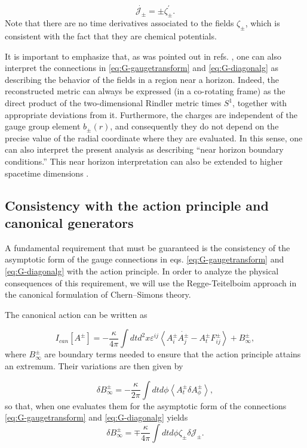 \documentclass[letterpaper,11pt,oneside]{book}
\begin{document}
\begin{equation}
	\dot{\mathcal{J}_{\pm}}=\pm\zeta_{\pm}^{\prime}.\label{eq:G-fieldeq}
\end{equation}
Note that there are no time derivatives associated to the fields $\zeta_{\pm}$,
which is consistent with the fact that they are chemical potentials.

It is important to emphasize that, as was pointed out in refs. \cite{Afshar:2016wfy,Afshar:2016kjj},
one can also interpret the connections in \eqref{eq:G-gaugetransform}
and \eqref{eq:G-diagonalg} as describing the behavior of the fields
in a region near a horizon. Indeed, the reconstructed metric can always
be expressed (in a co-rotating frame) as the direct product of the
two-dimensional Rindler metric times $S^{1}$, together with appropriate
deviations from it. Furthermore, the charges are independent of the
gauge group element $b_{\pm}\left(r\right)$, and consequently they
do not depend on the precise value of the radial coordinate where
they are evaluated. In this sense, one can also interpret the present
analysis as describing ``near horizon boundary conditions.'' This
near horizon interpretation can also be extended to higher spacetime
dimensions \cite{Grumiller2020ssng}.

\subsection{Consistency with the action principle and canonical generators}

A fundamental requirement that must be guaranteed is the consistency
of the asymptotic form of the gauge connections in eqs. \eqref{eq:G-gaugetransform}
and \eqref{eq:G-diagonalg} with the action principle. In order to
analyze the physical consequences of this requirement, we will use
the Regge-Teitelboim approach \cite{Regge:1974zd} in the canonical
formulation of Chern--Simons theory.

The canonical action can be written as

\[
I_{can}\left[A^{\pm}\right]=-\frac{\kappa}{4\pi}\int dtd^{2}x\varepsilon^{ij}\left\langle A_{i}^{\pm}\dot{A_{j}^{\pm}}-A_{t}^{\pm}F_{ij}^{\pm}\right\rangle +B_{\infty}^{\pm},
\]
where $B_{\infty}^{\pm}$ are boundary terms needed to ensure that
the action principle attains an extremum. Their variations are then
given by

\[
\delta B_{\infty}^{\pm}=-\frac{\kappa}{2\pi}\int dtd\phi\left\langle A_{t}^{\pm}\delta A_{\phi}^{\pm}\right\rangle ,
\]
so that, when one evaluates them for the asymptotic form of the connections
\eqref{eq:G-gaugetransform} and \eqref{eq:G-diagonalg} yields 
\begin{equation}
	\delta B_{\infty}^{\pm}=\mp\frac{\kappa}{4\pi}\int dtd\phi\zeta_{\pm}\delta\mathcal{J_{\pm}}.\label{eq:G-deltaB}
\end{equation}
\end{document}
